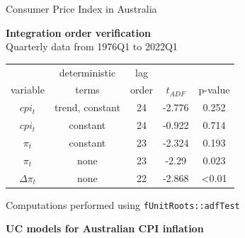 \documentclass[notes,blackandwhite,mathsans,usenames,dvipsnames]{beamer}
\begin{document}
\begin{frame}{Consumer Price Index in Australia}

\begin{center}
\textbf{Integration order verification}\\
{\color{mcxs2}Quarterly data from 1976Q1 to 2022Q1}

\smallskip
\begin{tabular}{ccccc}
\toprule
 & deterministic & lag& & \\
variable& terms & order & $t_{ADF}$ & p-value\\
\midrule
$cpi_t$ & trend, constant & 24 & -2.776 & 0.252 \\
$cpi_t$ & constant & 24 & -0.922 & 0.714 \\[0.5ex]
\midrule
$\pi_t$ & constant & 23 & -2.324 & 0.193 \\
$\pi_t$ &  none & 23 & -2.29 & 0.023 \\[0.5ex]
\midrule
$\Delta \pi_t$ & none & 22 & -2.868 & <0.01 \\[0.5ex]
\bottomrule
\end{tabular}

\smallskip \small{\color{mcxs2}Computations performed using} \texttt{fUnitRoots::adfTest}
\end{center}
\end{frame}








{
\begin{frame}

\begin{adjustwidth}{-0.5cm}{0cm}
\vspace{8.3cm}\Large
\textbf{{\color{mcxs3}UC models for} {\color{mcxs1}Australian CPI inflation}}
\end{adjustwidth}

\end{frame}
}
\end{document}
